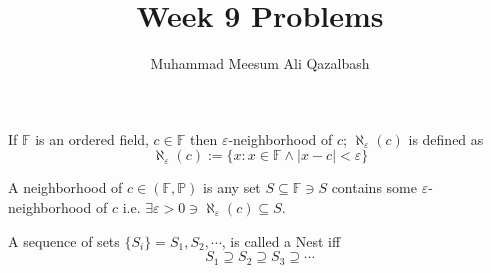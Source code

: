 \documentclass[addpoints]{exam}
\title{Week 9 Problems}
\author{Muhammad Meesum Ali Qazalbash}
\theoremstyle{mytheoremstyle}
\theoremstyle{mytheoremstyle}
\theoremstyle{myproblemstyle}
\begin{document}
	\maketitle
	\begin{center}
		\gradetable[h][questions]
	\end{center}

	\begin{definition}
		If \(\mathbb{F}\) is an ordered field, \(c\in\mathbb{F}\) then \(\varepsilon\)-neighborhood of \(c\); \(\aleph_{\varepsilon}(c)\) is defined as
		\[\aleph_{\varepsilon}(c):=\{x:x\in\mathbb{F}\land |x-c|<\varepsilon\}\]
	\end{definition}

	\begin{definition}[Neighborhood]
		A neighborhood of \(c\in(\mathbb{F},\mathbb{P})\) is any set \(S\subseteq\mathbb{F}\ni S\) contains some \(\varepsilon\)-neighborhood of \(c\) i.e. \(\exists \varepsilon>0\ni\aleph_{\varepsilon}(c)\subseteq S\).
	\end{definition}

	\begin{definition}[Nest] 
		A sequence of sets \(\{S_i\}=S_1,S_2,\cdots\), is called a Nest iff \[S_1\supseteq S_2\supseteq S_3\supseteq\cdots\]
	\end{definition}

\end{document}

